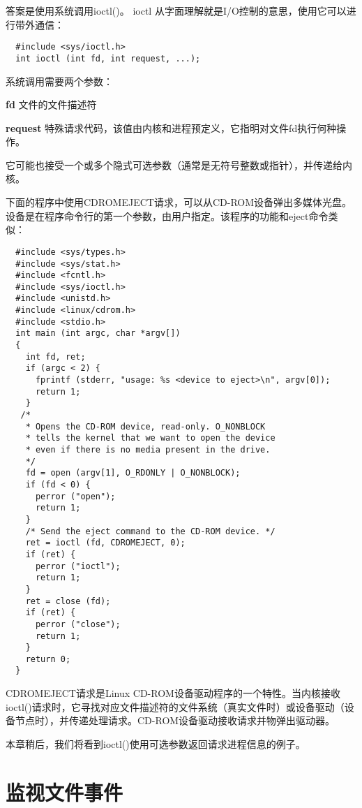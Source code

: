 答案是使用系统调用ioctl()。 ioctl 从字面理解就是I/O控制的意思，使用它可以进行带外通信：

\begin{lstlisting}
  #include <sys/ioctl.h>
  int ioctl (int fd, int request, ...);
\end{lstlisting}

系统调用需要两个参数：

\begin{eqlist*}
\item[\textbf{fd}] 文件的文件描述符
\item[\textbf{request}] 特殊请求代码，该值由内核和进程预定义，它指明对文件fd执行何种操作。
\end{eqlist*}

它可能也接受一个或多个隐式可选参数（通常是无符号整数或指针），并传递给内核。

下面的程序中使用CDROMEJECT请求，可以从CD-ROM设备弹出多媒体光盘。设备是在程序命令行的第一个参数，由用户指定。该程序的功能和eject命令类似：

\begin{lstlisting}
  #include <sys/types.h>
  #include <sys/stat.h>
  #include <fcntl.h>
  #include <sys/ioctl.h>
  #include <unistd.h>
  #include <linux/cdrom.h>
  #include <stdio.h>
  int main (int argc, char *argv[])
  {
    int fd, ret;
    if (argc < 2) {
      fprintf (stderr, "usage: %s <device to eject>\n", argv[0]);
      return 1;
    }
   /*
    * Opens the CD-ROM device, read-only. O_NONBLOCK
    * tells the kernel that we want to open the device
    * even if there is no media present in the drive.
    */
    fd = open (argv[1], O_RDONLY | O_NONBLOCK);
    if (fd < 0) {
      perror ("open");
      return 1;
    }
    /* Send the eject command to the CD-ROM device. */
    ret = ioctl (fd, CDROMEJECT, 0);
    if (ret) {
      perror ("ioctl");
      return 1;
    }
    ret = close (fd);
    if (ret) {
      perror ("close");
      return 1;
    }
    return 0;
  }
\end{lstlisting}

CDROMEJECT请求是Linux CD-ROM设备驱动程序的一个特性。当内核接收ioctl()请求时，它寻找对应文件描述符的文件系统（真实文件时）或设备驱动（设备节点时），并传递处理请求。CD-ROM设备驱动接收请求并物弹出驱动器。

本章稍后，我们将看到ioctl()使用可选参数返回请求进程信息的例子。

\section{监视文件事件}

